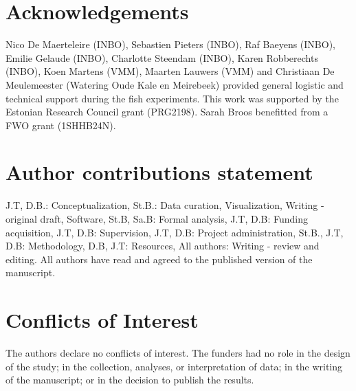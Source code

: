 \documentclass[fleqn,10pt]{wlscirep}
\begin{document}


\section*{Acknowledgements}

Nico De Maerteleire (INBO), Sebastien Pieters (INBO), Raf Baeyens (INBO), Emilie Gelaude (INBO), Charlotte Steendam (INBO), Karen Robberechts (INBO), Koen Martens (VMM), Maarten Lauwers (VMM) and Christiaan De Meulemeester (Watering Oude Kale en Meirebeek)  provided general logistic and technical support during the fish experiments. This work was supported by the Estonian Research Council grant (PRG2198). Sarah Broos benefitted from a FWO grant (1SHHB24N). 

\section*{Author contributions statement}

J.T, D.B.: Conceptualization, St.B.: Data curation, Visualization, Writing - original draft, Software, St.B, Sa.B: Formal analysis, J.T, D.B: Funding acquisition, J.T, D.B: Supervision, J.T, D.B: Project administration, St.B., J.T, D.B: Methodology, D.B, J.T: Resources, All authors: Writing - review and editing. All authors have read and agreed to the published version of the manuscript.




\section*{Conflicts of Interest} 
The authors declare no conflicts of interest. The funders had no role in the design of the study; in the collection, analyses, or interpretation of data; in the writing of the manuscript; or in the decision to publish the results.
\end{document}
